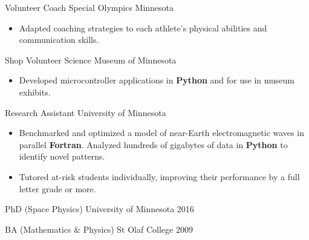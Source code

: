 \documentclass[12pt,letterpaper]{article}
\begin{document}
\headerrow
    {Volunteer Coach}
    {Special Olympics Minnesota}
    {}
\begin{itemize}
    \item Adapted coaching strategies to each athlete's physical abilities and communication skills.
\end{itemize}

\headerrow
    {Shop Volunteer}
    {Science Museum of Minnesota}
    {}
\begin{itemize}
    \item Developed microcontroller applications in \textbf{Python} and \textbf{\CPP} for use in museum exhibits.
\end{itemize}

\headerrow
    {Research Assistant}
    {University of Minnesota}
    {}
\begin{itemize}
    \item Benchmarked and optimized a model of near-Earth electromagnetic waves in parallel \textbf{Fortran}. Analyzed hundreds of gigabytes of data in \textbf{Python} to identify novel patterns.
    \item Tutored at-risk students individually, improving their performance by a full letter grade or more.
\end{itemize}

\Break

\headerrow
    {PhD (Space Physics)}
    {University of Minnesota}
    {2016}

\headerrow
    {BA (Mathematics \& Physics)}
    {St Olaf College}
    {2009}
\end{document}
